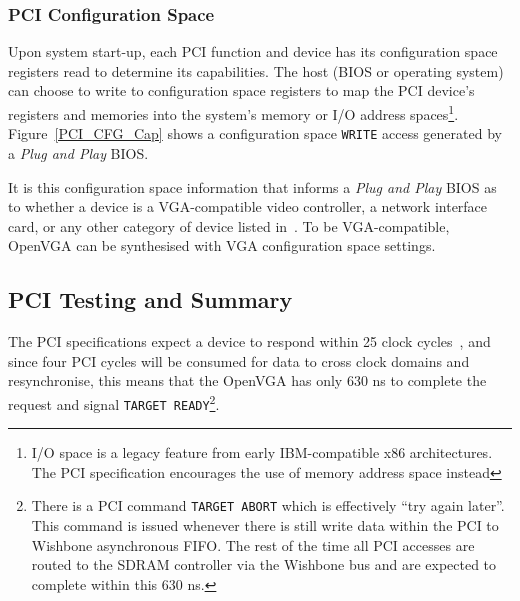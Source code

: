 

\subsubsection{PCI Configuration Space}
Upon system start-up, each PCI function and device has its configuration space
registers read to determine its capabilities. The host (BIOS or operating system)
can choose to write to configuration space registers to map the PCI device's
registers and memories into the system's memory or I/O address
spaces\footnote{I/O space is a legacy feature from early IBM-compatible x86
architectures. The PCI specification encourages the use of memory address space
instead\cite{PCI_Spec, PCI_Book}}. Figure~\ref{PCI_CFG_Cap} shows a configuration
space \texttt{WRITE} access generated by a \textit{Plug and Play} BIOS.

It is this configuration space information that informs a \textit{Plug and Play}
BIOS as to whether a device is a VGA-compatible video controller, a network
interface card, or any other category of device listed in~\cite{PCI_Spec}. To be
VGA-compatible, OpenVGA can be synthesised with VGA configuration space settings.


\subsection{PCI Testing and Summary}
The PCI specifications expect a device to respond within 25 clock
cycles~\cite{PCI_Spec}, and since four PCI cycles will be consumed for data to
cross clock domains and resynchronise, this means that the OpenVGA has only 630
ns to complete the request and signal \texttt{TARGET READY}\footnote{There is a
PCI command \texttt{TARGET ABORT} which is effectively ``try again later''. This
command is issued whenever there is still write data within the PCI to Wishbone
asynchronous FIFO. The rest of the time all PCI accesses are routed to the SDRAM
controller via the Wishbone bus and are expected to complete within this 630
ns.}.

